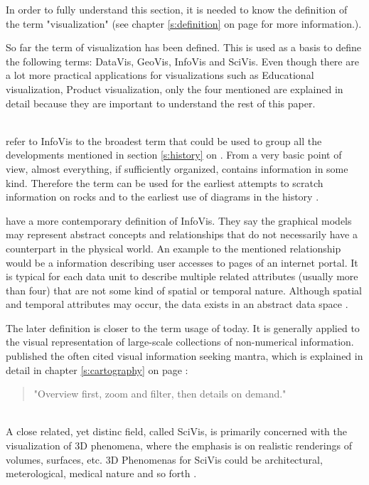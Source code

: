 In order to fully understand this section, it is needed to know the definition of the term "visualization" (see chapter \ref{s:definition} on page \pageref{s:definition} for more information.).

So far the term of visualization has been defined. This is used as a basis to define the following terms: \ac{DataVis}, \ac{GeoVis}, \ac{InfoVis} and \ac{SciVis}. Even though there are a lot more practical applications for visualizations such as Educational visualization, Product visualization, only the four mentioned are explained in detail because they are important to understand the rest of this paper.

\begin{enumerate}

 \hfill \\
\citeauthor{Friendly.2001} refer to \ac{InfoVis} to the broadest term that could be used to group all the developments mentioned in section \ref{s:history} on \pageref{s:history}. From a very basic point of view, almost everything, if sufficiently organized, contains information in some kind. Therefore the term can be used for the earliest attempts to scratch information on rocks and to the earliest use of diagrams in the history .

\citeauthor{Ferreira2003} have a more contemporary definition of \ac{InfoVis}. They say the graphical models may represent abstract concepts and relationships that do not necessarily have a counterpart in the physical world. An example to the mentioned relationship would be a information describing user accesses to pages of an internet portal. It is typical for each data unit to describe multiple related attributes (usually more than four) that are not some kind of spatial or temporal nature. Although spatial and temporal attributes may occur, the data exists in an abstract data space .

The later definition is closer to the term usage of today. It is generally applied to the visual representation of large-scale collections of non-numerical information. \citeauthor{Shneiderman1996} published the often cited visual information seeking mantra, which is explained in detail in chapter \ref{s:cartography} on page \pageref{s:cartography} :
\begin{quote}
"Overview first, zoom and filter, then details on demand."
\end{quote}

 \hfill \\
A close related, yet distinc field, called \ac{SciVis}, is primarily concerned with the visualization of 3D phenomena, where the emphasis is on realistic renderings of volumes, surfaces, etc. 3D Phenomenas for \ac{SciVis} could be architectural, meterological, medical nature and so forth .


\end{enumerate}
